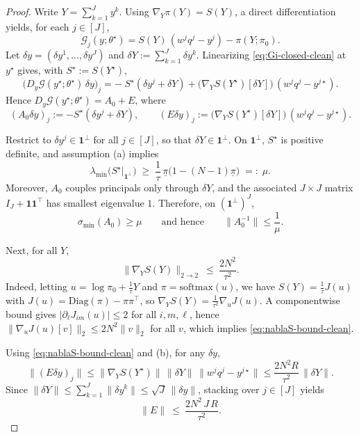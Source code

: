 \documentclass{article}
\begin{document}
\begin{proof}
Write \(Y=\sum_{k=1}^J y^k\). Using \(\nabla_Y\pi(Y)=S(Y)\), a direct differentiation yields, for each \(j\in[J]\),
\begin{equation}
\label{eq:Gi-closed-clean}
\mathcal{G}_j(y;\theta^\star)=S(Y)\,(w^jq^{j}-y^j)-\pi(Y;\pi_0).
\end{equation}
Let \(\delta y=(\delta y^1,\dots,\delta y^J)\) and \(\delta Y:=\sum_{k=1}^J\delta y^k\).
Linearizing \eqref{eq:Gi-closed-clean} at \(y^\star\) gives, with \(S^\star:=S(Y^\star)\),
\[
\big(D_y\mathcal{G}(y^\star;\theta^\star)\,\delta y\big)_j
=
-\;S^\star(\delta y^j+\delta Y)
+\big(\nabla_Y S(Y^\star)[\delta Y]\big)\,(w^jq^j-y^{j\star}).
\]
Hence \(D_y\mathcal{G}(y^\star;\theta^\star)=A_0+E\), where
\[
(A_0\delta y)_j:=-S^\star(\delta y^j+\delta Y),
\qquad
(E\delta y)_j:=\big(\nabla_Y S(Y^\star)[\delta Y]\big)\,(w^jq^j-y^{j\star}).
\]

Restrict to \(\delta y^j\in\mathbf 1^\perp\) for all \(j\in[J]\), so that \(\delta Y\in\mathbf 1^\perp\). On \(\mathbf 1^\perp\),
\(S^\star\) is positive definite, and assumption (a) implies
\begin{equation}
\label{eq:mu-lower-clean}
\lambda_{\min}\!\big(S^\star\big|_{\mathbf 1^\perp}\big)
\;\ge\;
\frac{1}{\tau}\,\underline\pi\bigl(1-(N-1)\underline\pi\bigr)
\;=:\;\mu.
\end{equation}
Moreover, \(A_0\) couples principals only through \(\delta Y\), and the associated \(J\times J\) matrix
\(I_J+\mathbf 1\mathbf 1^\top\) has smallest eigenvalue \(1\). Therefore, on \((\mathbf 1^\perp)^J\),
\begin{equation}
\label{eq:A0-inv-clean}
\sigma_{\min}(A_0)\ge \mu
\qquad\text{and hence}\qquad
\|A_0^{-1}\|\le \frac{1}{\mu}.
\end{equation}

Next, for all \(Y\),
\begin{equation}
\label{eq:nablaS-bound-clean}
\big\|\nabla_Y S(Y)\big\|_{2\to 2}\ \le\ \frac{2N^2}{\tau^2}.
\end{equation}
Indeed, letting \(u=\log\pi_0+\tfrac{1}{\tau}Y\) and \(\pi=\mathrm{softmax}(u)\), we have
\(S(Y)=\tfrac{1}{\tau}J(u)\) with \(J(u)=\mathrm{Diag}(\pi)-\pi\pi^\top\), so
\(\nabla_Y S(Y)=\tfrac{1}{\tau^2}\nabla_u J(u)\). A componentwise bound gives
\(|\partial_\ell J_{im}(u)|\le 2\) for all \(i,m,\ell\), hence \(\|\nabla_u J(u)[v]\|_2\le 2N^2\|v\|_2\) for all \(v\),
which implies \eqref{eq:nablaS-bound-clean}.

Using \eqref{eq:nablaS-bound-clean} and (b), for any \(\delta y\),
\[
\|(E\delta y)_j\|
\le
\|\nabla_Y S(Y^\star)\|\,\|\delta Y\|\,\|w^jq^j-y^{j\star}\|
\le
\frac{2N^2 R}{\tau^2}\,\|\delta Y\|.
\]
Since \(\|\delta Y\|\le \sum_{k=1}^J\|\delta y^k\|\le \sqrt{J}\,\|\delta y\|\), stacking over \(j\in[J]\) yields
\begin{equation}
\label{eq:E-bound-clean}
\|E\|\ \le\ \frac{2N^2\,J\,R}{\tau^2}.
\end{equation}


\end{proof}
\end{document}
